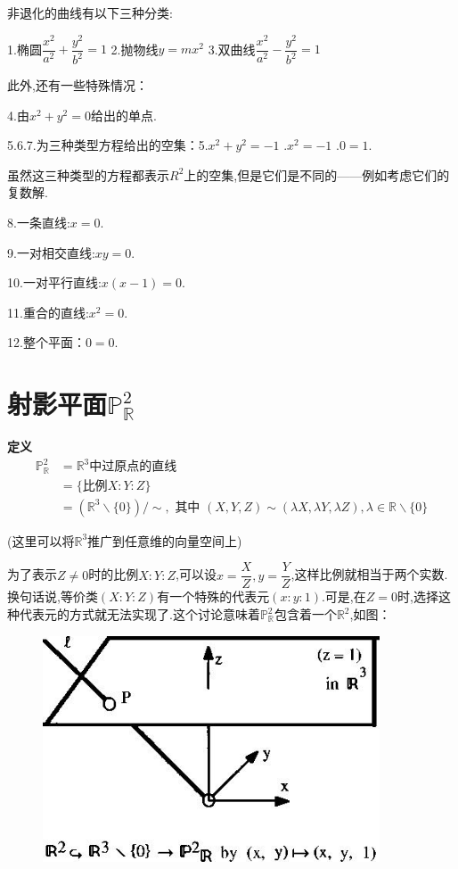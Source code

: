 \documentclass[UTF8]{book}
\begin{document}
	
		非退化的曲线有以下三种分类:
	
	
		1.椭圆$\dfrac{x^{2}}{a^{2}}+\dfrac{y^{2}}{b^{2}}=1$\indent
		2.抛物线$y=mx^{2}$\indent
		3.双曲线$\dfrac{x^{2}}{a^{2}}-\dfrac{y^{2}}{b^{2}}=1$
	
	
		此外,还有一些特殊情况：
	
	
		4.由$x^{2}+y^{2}=0$给出的单点.
	
	
		5.6.7.为三种类型方程给出的空集：5.$x^{2}+y^{2}=-1$ .$x^{2}=-1$ .$ 0=1 $.
		
		
		虽然这三种类型的方程都表示$R^{2}$上的空集,但是它们是不同的——例如考虑它们的复数解.
		
		
		8.一条直线:$ x=0 $.
		
		
		9.一对相交直线:$ xy=0 $.
		
		
		10.一对平行直线:$ x(x-1)=0 $.
		
		
		11.重合的直线:$x^{2}=0$.
		
		
		12.整个平面：$ 0=0 $.
	
	
	\section{射影平面$\mathbb{P}^{2}_{\mathbb{R}}$}
		\textbf{定义}
		\begin{equation*}
		\begin{aligned} \mathbb{P}^{2}_{\mathbb{R}}&= \mathbb{R}^{3} \text {中过原点的直线} \\ &=\{\text {比例} X : Y : Z\} \\ &=\left(\mathbb{R}^{3} \backslash\{0\}\right)/ \sim, \text { 其中 }(X, Y, Z) \sim(\lambda X, \lambda Y, \lambda Z), \lambda \in \mathbb{R} \backslash\{0\} \end{aligned}
		\end{equation*}
	
		(这里可以将$\mathbb{R}^{3}$推广到任意维的向量空间上)
	
	
	 	为了表示$ Z\neq0 $时的比例$ X:Y:Z $,可以设$x=\dfrac{X}{Z},y=\dfrac{Y}{Z}$,这样比例就相当于两个实数.换句话说,等价类$ (X:Y:Z) $有一个特殊的代表元$ (x:y:1) $.可是,在$ Z=0 $时,选择这种代表元的方式就无法实现了.这个讨论意味着$\mathbb{P}^{2}_{\mathbb{R}}$包含着一个$\mathbb{R}^{2}$,如图：
		\begin{figure}[H]
		  \centering
		  \includegraphics[width=10cm]{12.jpg}
		\end{figure}
	
\end{document}

